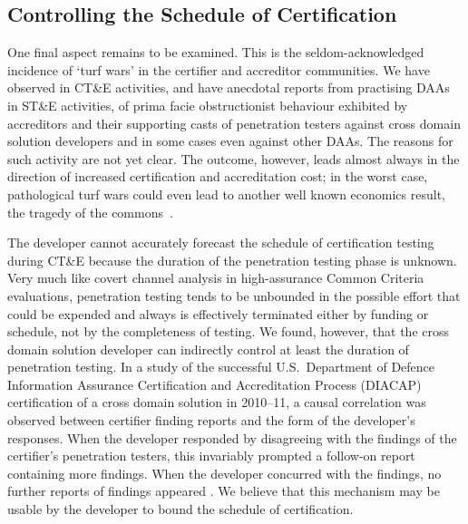 \documentclass{llncs}
\begin{document}
\subsection{Controlling the Schedule of Certification}

One final aspect remains to be examined.  This is the seldom-acknowledged
incidence of `turf wars' in the certifier and accreditor communities.  We have
observed in CT\&E activities, and have anecdotal reports from
practising DAAs in ST\&E activities, of prima facie obstructionist behaviour exhibited
by accreditors and their supporting casts of penetration testers
against cross domain solution developers and in some cases even against other DAAs.
The reasons for such activity are not yet clear.  The outcome, however,
leads almost always in the direction of increased certification and accreditation cost; in
the worst case, pathological turf wars could even lead to another well known
economics result, the tragedy of the commons~\cite{Hardin1968}.

The developer cannot accurately forecast the schedule of certification testing
during CT\&E because the duration of the penetration testing phase is unknown.
Very much like covert channel analysis in high-assurance Common Criteria
evaluations, penetration testing tends to be unbounded in the possible effort
that could be expended and always is effectively terminated either by funding or
schedule, not by the completeness of testing.  We found, however, that the
cross domain solution developer can indirectly control at least
the duration of penetration testing.  In a study of the successful U.S.\ Department
of Defence Information Assurance Certification and Accreditation Process (DIACAP)
certification of a cross domain solution in 2010--11, a causal correlation was
observed between certifier finding reports and the form of the developer's
responses.  When the developer responded by disagreeing with the findings of
the certifier's penetration testers, this invariably prompted a follow-on report
containing more findings.  When the developer concurred with the findings, no
further reports of findings appeared \cite{Loughry2012b}.  We believe that this
mechanism may be usable by the developer to bound the schedule of certification.

\end{document}
